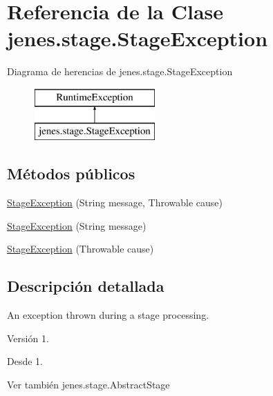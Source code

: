 \hypertarget{classjenes_1_1stage_1_1_stage_exception}{\section{Referencia de la Clase jenes.\-stage.\-Stage\-Exception}
\label{classjenes_1_1stage_1_1_stage_exception}
}
Diagrama de herencias de jenes.\-stage.\-Stage\-Exception\begin{figure}[H]
\begin{center}
\leavevmode
\includegraphics[height=2.000000cm]{classjenes_1_1stage_1_1_stage_exception}
\end{center}
\end{figure}
\subsection*{Métodos públicos}
\begin{DoxyCompactItemize}
\item 
\hyperlink{classjenes_1_1stage_1_1_stage_exception_a4d0eb751151a2693b452176fd2fae090}{Stage\-Exception} (String message, Throwable cause)
\item 
\hyperlink{classjenes_1_1stage_1_1_stage_exception_aff6f4c1b58696d6e0aae42eaa78c3506}{Stage\-Exception} (String message)
\item 
\hyperlink{classjenes_1_1stage_1_1_stage_exception_ab95390b5a08e2fe49d3f354204390710}{Stage\-Exception} (Throwable cause)
\end{DoxyCompactItemize}


\subsection{Descripción detallada}
An exception thrown during a stage processing. 

\begin{DoxyVersion}{Versión}
1. 
\end{DoxyVersion}
\begin{DoxySince}{Desde}
1.
\end{DoxySince}
\begin{DoxySeeAlso}{Ver también}
jenes.\-stage.\-Abstract\-Stage 
\end{DoxySeeAlso}


